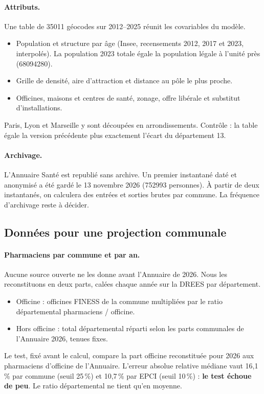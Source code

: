 \paragraph{Attributs.} Une table de \num{35011} géocodes sur 2012--2025 réunit les covariables du modèle.
\begin{itemize}
  \item Population et structure par âge (Insee, recensements 2012, 2017 et 2023, interpolés). La population
  2023 totale égale la population légale à l'unité près (\num{68094280})\mesure{}.
  \item Grille de densité, aire d'attraction et distance au pôle le plus proche.
  \item Officines, maisons et centres de santé, zonage, offre libérale et substitut d'installations.
\end{itemize}
Paris, Lyon et Marseille y sont découpées en arrondissements. Contrôle : la table égale la version précédente plus
exactement l'écart du département 13\mesure{}.

\paragraph{Archivage.} L'Annuaire Santé est republié sans archive. Un premier instantané daté et anonymisé a été
gardé le 13 novembre 2026 (\num{752993} personnes)\mesure{}. À partir de deux instantanés, on calculera des
entrées et sorties brutes par commune. La fréquence d'archivage reste à décider.

\subsection{Données pour une projection communale}\label{a4-sec:res-projcom}
\paragraph{Pharmaciens par commune et par an.} Aucune source ouverte ne les donne avant l'Annuaire de 2026. Nous
les reconstituons en deux parts, calées chaque année sur la DREES par département.
\begin{itemize}
  \item Officine : officines FINESS de la commune multipliées par le ratio départemental pharmaciens / officine.
  \item Hors officine : total départemental réparti selon les parts communales de l'Annuaire 2026, tenues
  fixes\suppose{}.
\end{itemize}
Le test, fixé avant le calcul, compare la part officine reconstituée pour 2026 aux pharmaciens d'officine de
l'Annuaire. L'erreur absolue relative médiane vaut 16,1\,\% par commune (seuil 25\,\%) et 10,7\,\% par
EPCI (seuil 10\,\%)\mesure{} : \textbf{le test échoue de peu}. Le ratio départemental ne tient qu'en moyenne.

